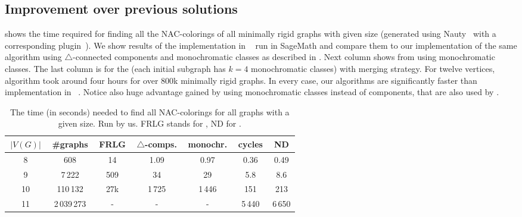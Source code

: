 \subsection{Improvement over previous solutions}

shows the time required for finding all the NAC-colorings
of all minimally rigid graphs with given size (generated using Nauty~\cite{nauty}
with a corresponding plugin~\cite{nauty_plugin}).
We show results of the implementation in \flexrilog{}~\cite{flexrilog} run in SageMath
and compare them to our implementation of the same \Naive{} algorithm
using $\triangle$-connected components
and monochromatic classes as described in .
Next column shows \NaiveCycles{} from 
using monochromatic classes.
The last column is for the \NeighborsDegree{} (each initial subgraph has $k=4$ monochromatic classes)
with \MergeLinear{} merging strategy.
For twelve vertices, \Neighbors{} algorithm took around four hours for over 800k minimally rigid graphs.
In every case, our algorithms are significantly faster than implementation in \flexrilog{}~\cite{flexrilog}.
Notice also huge advantage gained by using monochromatic classes instead of \trcon{} components,
that are also used by \flexrilog{}.
%
\begin{table}[ht]
	\caption[Running times on graphs.]{
		The time (in seconds) needed to find all NAC-colorings for all graphs with a given size. Run by us.
		\textsc{FRLG} stands for \flexrilog{}, \textsc{ND} for \NeighborsDegree{}.}%
	\label{tab:all_min_rigid}
	\vspace{0.3cm}
	\centering
	\begin{tabular}{ccccccc}
		\hline
		\,$|V(G)|$\, & \,\#graphs\, & \,FRLG\, & \,$\triangle$-comps.\, & \,monochr.\, & \,cycles\, & \,\textsc{ND}\, \\
		\hline
		8            & 608          & 14       & 1.09                   & 0.97         & 0.36       & 0.49            \\
		9            & 7\,222       & 509      & 34                     & 29           & 5.8        & 8.6             \\
		10           & 110\,132     & 27k      & 1\,725                 & 1\,446       & 151        & 213             \\
		11           & 2\,039\,273  & -        & -                      & -            & 5\,440     & 6\,650          \\
		\hline
	\end{tabular}
\end{table}


